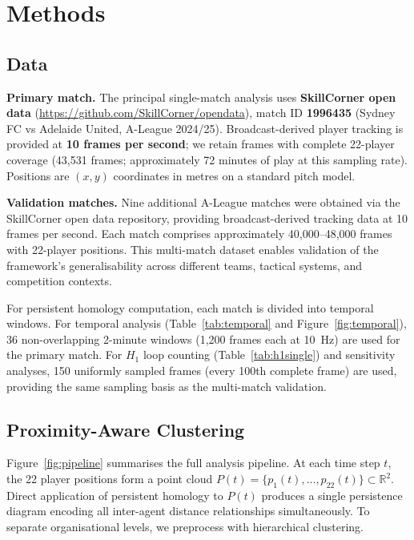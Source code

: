 \section{Methods}
\label{sec:methods}

\subsection{Data}

\textbf{Primary match.} The principal single-match analysis uses \textbf{SkillCorner open data} (\url{https://github.com/SkillCorner/opendata}), match ID \textbf{1996435} (Sydney FC vs Adelaide United, A-League 2024/25). Broadcast-derived player tracking is provided at \textbf{10 frames per second}; we retain frames with complete 22-player coverage (43{,}531 frames; approximately 72 minutes of play at this sampling rate). Positions are $(x,y)$ coordinates in metres on a standard pitch model.

\textbf{Validation matches.} Nine additional A-League matches were obtained via the SkillCorner open data repository, providing broadcast-derived tracking data at 10 frames per second. Each match comprises approximately 40,000--48,000 frames with 22-player positions. This multi-match dataset enables validation of the framework's generalisability across different teams, tactical systems, and competition contexts.

For persistent homology computation, each match is divided into temporal windows. For temporal analysis (Table~\ref{tab:temporal} and Figure~\ref{fig:temporal}), 36 non-overlapping 2-minute windows (1{,}200 frames each at 10~Hz) are used for the primary match. For \(H_1\) loop counting (Table~\ref{tab:h1single}) and sensitivity analyses, 150 uniformly sampled frames (every 100th complete frame) are used, providing the same sampling basis as the multi-match validation.

\subsection{Proximity-Aware Clustering}

Figure~\ref{fig:pipeline} summarises the full analysis pipeline. At each time step \(t\), the 22 player positions form a point cloud \(P(t)=\{p_1(t),\ldots,p_{22}(t)\}\subset\mathbb{R}^2\). Direct application of persistent homology to \(P(t)\) produces a single persistence diagram encoding all inter-agent distance relationships simultaneously. To separate organisational levels, we preprocess with hierarchical clustering.

